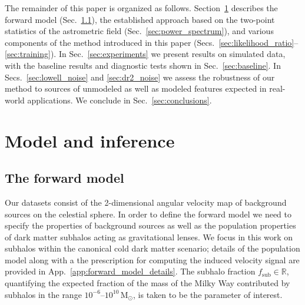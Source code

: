 \documentclass[twocolumn]{aastex631}
\begin{document}
The remainder of this paper is organized as follows. Section~\ref{sec:model} describes the forward model (Sec.~\ref{sec:forward_model}), the established approach based on the two-point statistics of the astrometric field (Sec.~\ref{sec:power_spectrum}), and various components of the method introduced in this paper (Secs.~\ref{sec:likelihood_ratio}--\ref{sec:training}). In Sec.~\ref{sec:experiments} we present results on simulated data, with the baseline results and diagnostic tests shown in Sec.~\ref{sec:baseline}. In Secs.~\ref{sec:lowell_noise} and \ref{sec:dr2_noise} we assess the robustness of our method to sources of unmodeled as well as modeled features expected in real-world applications. We conclude in Sec.~\ref{sec:conclusions}.

\section{Model and inference}
\label{sec:model}

\subsection{The forward model}
\label{sec:forward_model}

Our datasets consist of the 2-dimensional angular velocity map of background sources on the celestial sphere. {In order to define the forward model we need to specify the properties of background sources as well as the population properties of dark matter subhalos acting as gravitational lenses. We focus in this work on subhalos within the canonical cold dark matter scenario; details of the population model along with a the prescription for computing the induced velocity signal are provided in App.~\ref{app:forward_model_details}.} The subhalo fraction {$f_\mathrm{sub}\in \mathbb R$}, quantifying the expected fraction of the mass of the Milky Way contributed by subhalos in the range $10^{-6}$--$10^{10}\,\mathrm{M}_\odot$, is taken to be the parameter of interest.
\end{document}
